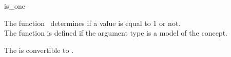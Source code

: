 \begin{ccRefFunction}{is_one}

\ccDefinition

The function \ccRefName\ determines if a value is equal to 1 or not.\\
The function is defined if the argument type 
is a model of the  concept. 


        { The  is convertible to . }


\ccSeeAlso

\\
\\

\end{ccRefFunction}
